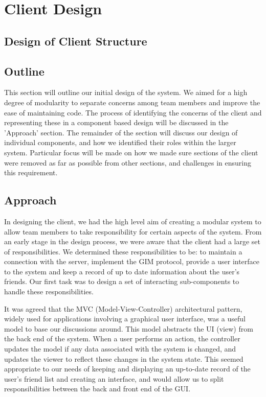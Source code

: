 \section{Client Design}

\subsection{Design of Client Structure}

\subsection{Outline}

This section will outline our initial design of the system. We aimed for a high degree of modularity to separate concerns among team members and improve the ease of maintaining code. The process of identifying the concerns of the client and representing these in a component based design will be discussed in the 'Approach' section. The remainder of the section will discuss our design of individual components, and how we identified their roles within the larger system. Particular focus will be made on how we made sure sections of the client were removed as far as possible from other sections, and challenges in ensuring this requirement. 

\subsection{Approach}

In designing the client, we had the high level aim of creating a modular system to allow team members to take responsibility for certain aspects of the system. From an early stage in the design process, we were aware that the client had a large set of responsibilities. We determined these responsibilities to be: to maintain a connection with the server, implement the GIM protocol, provide a user interface to the system and keep a record of up to date information about the user's friends. Our first task was to design a set of interacting sub-components to handle these responsibilities.

It was agreed that the MVC (Model-View-Controller) architectural pattern, widely used for applications involving a graphical user interface, was a useful model to base our discussions around. This model abstracts the UI (view) from the back end of the system. When a user performs an action, the controller updates the model if any data associated with the system is changed, and updates the viewer to reflect these changes in the system state. This seemed appropriate to our needs of keeping and displaying an up-to-date record of the user's friend list and creating an interface, and would allow us to split responsibilities between the back and front end of the GUI.

